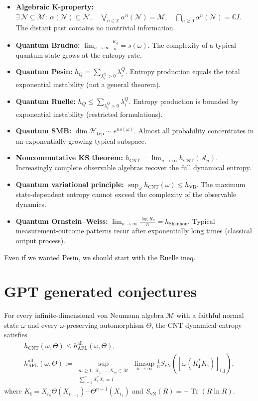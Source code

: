 \documentclass{article}
\begin{document}
\begin{itemize}
    \item \textbf{Algebraic K-property:} $\exists\,\mathcal N\subseteq\mathcal M:\ \alpha(\mathcal N)\subseteq\mathcal N,\quad \bigvee_{n\in\mathbb Z}\alpha^n(\mathcal N)=\mathcal M,\quad \bigcap_{n\geq0}\alpha^n(\mathcal N)=\mathbb CI.$ The distant past contains no nontrivial information.
    \item \textbf{Quantum Brudno:} $\displaystyle\lim_{n\to\infty}\frac{K_q}{n}=s(\omega).$ The complexity of a typical quantum state grows at the entropy rate.
    \item \textbf{Quantum Pesin:} $h_Q=\sum_{\lambda_i^Q>0}\lambda_i^Q.$ Entropy production equals the total exponential instability (not a general theorem).
    \item \textbf{Quantum Ruelle:} $h_Q\leq\sum_{\lambda_i^Q>0}\lambda_i^Q.$ Entropy production is bounded by exponential instability (restricted formulations).
    \item \textbf{Quantum SMB:} $\dim\mathcal H_{\mathrm{typ}}\sim e^{ns(\omega)}.$ Almost all probability concentrates in an exponentially growing typical subspace.
    \item \textbf{Noncommutative KS theorem:} $h_{\mathrm{CNT}}=\lim_{n\to\infty}h_{\mathrm{CNT}}(\mathcal A_n).$ Increasingly complete observable algebras recover the full dynamical entropy.
    \item \textbf{Quantum variational principle:} $\sup_\omega h_{\mathrm{CNT}}(\omega)\leq h_{\mathrm{VB}}.$ The maximum state-dependent entropy cannot exceed the complexity of the observable dynamics.
    \item \textbf{Quantum Ornstein--Weiss:} $\displaystyle\lim_{n\to\infty}\frac{\log R_n}{n}=h_{\mathrm{Shannon}}.$ Typical measurement-outcome patterns recur after exponentially long times (classical output process).
\end{itemize}

Even if we wanted Pesin, we should start with the Ruelle ineq. 
\section{GPT generated conjectures}
For every infinite-dimensional von Neumann algebra $\mathcal M$ with a faithful normal state $\omega$ and every $\omega$-preserving automorphism $\Theta$, the CNT dynamical entropy satisfies
\[
 \begin{gathered}
 h_{\mathrm{CNT}}(\omega,\Theta)
 \leq h_{\mathrm{AFL}}^{\mathrm{all}}(\omega,\Theta),\\
 h_{\mathrm{AFL}}^{\mathrm{all}}(\omega,\Theta)
 :=\sup_{\substack{m\geq1,\ X_1,\ldots,X_m\in\mathcal M\\
                   \sum_{i=1}^{m}X_i^*X_i=I}}
 \limsup_{n\to\infty}\frac1n
 S_{\mathrm{vN}}\!\left(
   [\omega(K_{\mathbf j}^*K_{\mathbf i})]_{\mathbf i,\mathbf j}
 \right),
 \end{gathered}
\]
where $K_{\mathbf i}=X_{i_n}\Theta(X_{i_{n-1}})\cdots\Theta^{n-1}(X_{i_1})$ and $S_{\mathrm{vN}}(R)=-\operatorname{Tr}(R\ln R)$.\\
\end{document}

